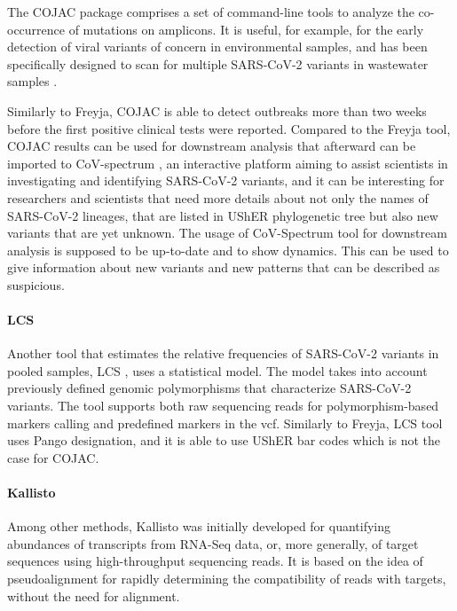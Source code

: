         The COJAC \cite{jahn2021,jahn2022} package comprises a set of command-line tools to analyze the co-occurrence of mutations on amplicons. It is useful, for example, for the early detection of viral variants of concern in environmental samples, and has been specifically designed to scan for multiple SARS-CoV-2 variants in wastewater samples \cite{cojac2022}.
        
        Similarly to Freyja, COJAC is able to detect outbreaks more than two weeks before the first positive clinical tests were reported. Compared to the Freyja tool, COJAC results can be used for downstream analysis that afterward can be imported to CoV-spectrum \cite{chen2022b}, an interactive platform aiming to assist scientists in investigating and identifying SARS-CoV-2 variants, and it can be interesting for researchers and scientists that need more details about not only the names of SARS-CoV-2 lineages, that are listed in UShER phylogenetic tree but also new variants that are yet unknown. The usage of CoV-Spectrum tool for downstream analysis is supposed to be up-to-date and to show dynamics. This can be used to give information about new variants and new patterns that can be described as suspicious.
        \paragraph{LCS}
        Another tool that estimates the relative frequencies of SARS-CoV-2 variants in pooled samples, LCS \cite{valieris2022}, uses a statistical model. The model takes into account previously defined genomic polymorphisms that characterize SARS-CoV-2 variants. The tool supports both raw sequencing reads for polymorphism-based markers calling and predefined markers in the \acrlong{vcf}. Similarly to Freyja, LCS tool uses Pango designation, and it is able to use UShER bar codes which is not the case for COJAC.
        \paragraph{Kallisto}
        Among other methods, Kallisto \cite{bray2016} was initially developed for quantifying abundances of transcripts from RNA-Seq data, or, more generally, of target sequences using high-throughput sequencing reads. It is based on the idea of pseudoalignment for rapidly determining the compatibility of reads with targets, without the need for alignment. 
        

